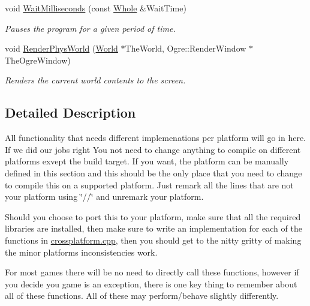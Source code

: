 \begin{DoxyCompactItemize}
void \hyperlink{namespacephys_1_1crossplatform_ab525e3abf3625b83954e2d55a5869d18}{WaitMilliseconds} (const \hyperlink{namespacephys_a460f6bc24c8dd347b05e0366ae34f34a}{Whole} \&WaitTime)
\begin{DoxyCompactList}\small\item\em Pauses the program for a given period of time. \item\end{DoxyCompactList}\item 
void \hyperlink{namespacephys_1_1crossplatform_a11ab7359564519dc966f997c98109f6e}{RenderPhysWorld} (\hyperlink{classphys_1_1World}{World} $\ast$TheWorld, Ogre::RenderWindow $\ast$TheOgreWindow)
\begin{DoxyCompactList}\small\item\em Renders the current world contents to the screen. \item\end{DoxyCompactList}\end{DoxyCompactItemize}


\subsection{Detailed Description}
All functionality that needs different implemenations per platform will go in here. If we did our jobs right You not need to change anything to compile on different platforms exvept the build target. If you want, the platform can be manually defined in this section and this should be the only place that you need to change to compile this on a supported platform. Just remark all the lines that are not your platform using \char`\"{}//\char`\"{} and unremark your platform. \par
\par
 Should you choose to port this to your platform, make sure that all the required libraries are installed, then make sure to write an implementation for each of the functions in \hyperlink{crossplatform_8cpp_source}{crossplatform.cpp}, then you should get to the nitty gritty of making the minor platforms inconsistencies work. \par
\par
 For most games there will be no need to directly call these functions, however if you decide you game is an exception, there is one key thing to remember about all of these functions. All of these may perform/behave slightly differently. 


